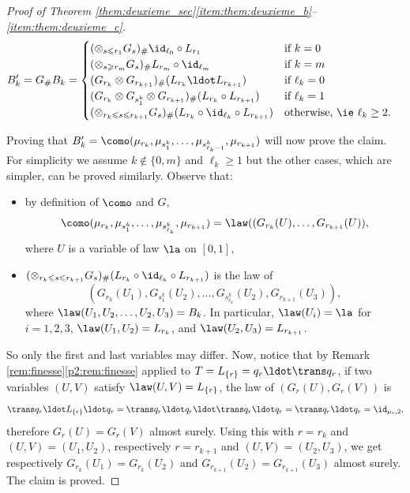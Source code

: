 \begin{proof}[Proof of Theorem \ref{them:deuxieme_sec}\eqref{item:them:deuxieme_b}--\eqref{item:them:deuxieme_c}]
\begin{align*}
B'_k&=G_\# B_k=\begin{cases}
(\otimes_{s\leqslant r_1} G_{s})_\#\id_{\ell_0}\circ L_{r_1}&\text{if }k=0\\
(\otimes_{s\geqslant r_m} G_{s})_\#L_{r_m}\circ \id_{\ell_m}&\text{if }k=m\\
(G_{r_k}\otimes G_{r_{k+1}})_\#(L_{r_{k}}{}\ldot L_{r_{k+1}})&\text{if }\ell_k=0\\
(G_{r_k}\otimes G_{s_1^k}\otimes G_{r_{k+1}})_\#(L_{r_{k}}\circ L_{r_{k+1}})&\text{if }\ell_k=1\\
(\otimes_{r_k\leqslant s\leqslant r_{k+1}}G_s)_\#(L_{r_{k}}\circ\id_{\ell_k}\circ L_{r_{k+1}})&\text{otherwise, \ie }\ell_k\geq 2.
\end{cases}
\end{align*}

\noindent Proving that $B'_k=\como(\mu_{r_k},\mu_{s^k_1},\ldots,\mu_{s^k_{\ell_k-1}},\mu_{r_{k+1}})$ will now prove the claim. For simplicity we assume $k\notin \{0,m\}$ and $\ell_k\geq 1$ but the other cases, which are simpler, can be proved similarly. Observe that:
\begin{itemize}
\item
by definition of $\como$ and $G$,
\[
\como(\mu_{r_k},\mu_{s_1^k},\ldots,\mu_{s^k_{\ell_k}},\mu_{r_{k+1}})=\law((G_{r_k}(U),\ldots,G_{r_{k+1}}(U)),
\]
where $U$ is a variable of law $\la$ on $[0,1]$,

\item
$(\otimes_{r_k\leqslant s\leqslant r_{k+1}}G_s)_\#(L_{r_{k}}\circ\id_{\ell_k}\circ L_{r_{k+1}})$ is the law of
\[
(G_{r_k}(U_1),G_{s^k_1}(U_2),\ldots,G_{s^k_{\ell_k}}(U_2),G_{r_{k+1}}(U_3)),
\]
where $\law(U_1,U_2,\ldots,U_2,U_3)=B_k$. In particular, $\law(U_i)=\la$ for $i=1,2,3$, $\law(U_1,U_2)=L_{r_k}$, and $\law(U_2,U_3)=L_{r_{k+1}}$.
\end{itemize}
So only the first and last variables may differ. Now, notice that by Remark \ref{rem:finesse}\eqref{p2:rem:finesse} applied to $T=L_{\{r\}}=q_r\ldot\trans q_r$, if two variables $(U,V)$ satisfy $\law(U,V)=L_{\{r\}}$, the law of $(G_{r}(U),G_r(V))$ is
\[
\trans q_r\ldot L_{\{r\}}{}\ldot q_r=\trans q_r\ldot q_r\ldot\trans q_r\ldot q_r=\trans q_r\ldot q_r=\id_{\mu_r,2},
\]
therefore $G_{r}(U)=G_r(V)$ almost surely. Using this with $r={r_k}$ and $(U,V)=(U_1,U_2)$, respectively $r=r_{k+1}$ and $(U,V)=(U_2,U_3)$, we get respectively $G_{r_k}(U_1)=G_{r_k}(U_2)$ and $G_{r_{k+1}}(U_2)=G_{r_{k+1}}(U_3)$ almost surely. The claim is proved.


\end{proof}
